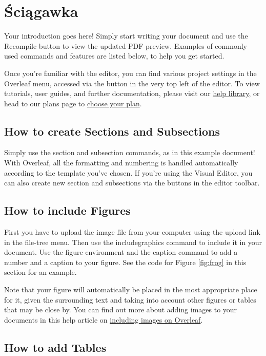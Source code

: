 \documentclass{article}
\begin{document}
\section{Ściągawka}
Your introduction goes here! Simply start writing your document and use the Recompile button to view the updated PDF preview. Examples of commonly used commands and features are listed below, to help you get started.

Once you're familiar with the editor, you can find various project settings in the Overleaf menu, accessed via the button in the very top left of the editor. To view tutorials, user guides, and further documentation, please visit our \href{https://www.overleaf.com/learn}{help library}, or head to our plans page to \href{https://www.overleaf.com/user/subscription/plans}{choose your plan}.


\subsection{How to create Sections and Subsections}

Simply use the section and subsection commands, as in this example document! With Overleaf, all the formatting and numbering is handled automatically according to the template you've chosen. If you're using the Visual Editor, you can also create new section and subsections via the buttons in the editor toolbar.


\subsection{How to include Figures}

First you have to upload the image file from your computer using the upload link in the file-tree menu. Then use the includegraphics command to include it in your document. Use the figure environment and the caption command to add a number and a caption to your figure. See the code for Figure \ref{fig:frog} in this section for an example.

Note that your figure will automatically be placed in the most appropriate place for it, given the surrounding text and taking into account other figures or tables that may be close by. You can find out more about adding images to your documents in this help article on \href{https://www.overleaf.com/learn/how-to/Including_images_on_Overleaf}{including images on Overleaf}.


\subsection{How to add Tables}
\end{document}
